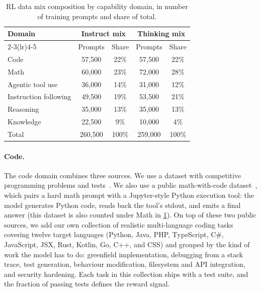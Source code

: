 \documentclass[11pt,a4paper]{article}
\newcommand{\tableheadercolor}{}
\begin{document}
\begin{table}[H]
  \centering
  \caption{RL data mix composition by capability domain, in number of
  training prompts and share of total.}
  \label{tab:rl-mix}
  \small
  \begin{tabular}{@{}lcccc@{}}
    \toprule
    \tableheadercolor
    \textbf{Domain} & \multicolumn{2}{c}{\textbf{Instruct mix}} & \multicolumn{2}{c}{\textbf{Thinking mix}} \\
    \cmidrule(lr){2-3}\cmidrule(lr){4-5}
                          & Prompts   & Share & Prompts   & Share \\
    \midrule
    Code                  & 57{,}500  & 22\% & 57{,}500  & 22\% \\
    Math                  & 60{,}000  & 23\% & 72{,}000  & 28\% \\
    Agentic tool use      & 36{,}000  & 14\% & 31{,}000  & 12\% \\
    Instruction following & 49{,}500  & 19\% & 53{,}500  & 21\% \\
    Reasoning             & 35{,}000  & 13\% & 35{,}000  & 13\% \\
    Knowledge             & 22{,}500  &  9\% & 10{,}000  &  4\% \\
    \midrule
    Total                 & 260{,}500 & 100\% & 259{,}000 & 100\% \\
    \bottomrule
  \end{tabular}
\end{table}

\paragraph{Code.}
The code domain combines three sources. We use a dataset with
competitive programming problems and tests~\cite{nemo-gym}.
We also use a public math-with-code dataset~\cite{nemo-gym}, which
pairs a hard math prompt with
a Jupyter-style Python execution tool: the model generates Python code, reads
back the tool's stdout, and emits a final answer (this dataset is also
counted under Math in \cref{tab:rl-mix}). On top of these two public
sources, we add our own collection of realistic multi-language coding
tasks covering twelve target languages (Python, Java, PHP,
TypeScript, C\#, JavaScript, JSX, Rust, Kotlin, Go, C++, and CSS) and
grouped by the kind of work the model has to do: greenfield
implementation, debugging from a stack trace, test generation,
behaviour modification, filesystem and API integration, and security
hardening. Each task in this collection ships with a test suite, and
the fraction of passing tests defines the reward signal.
\end{document}
